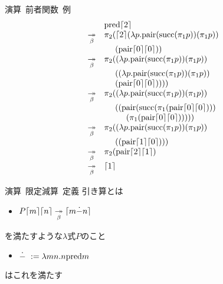 \documentclass[pdflatex,17pt]{beamer}
\begin{document}
\begin{frame}{演算~前者関数~例}
    \scriptsize
    $$ \begin{array}{rl}
             & {\rm pred}\lceil 2 \rceil \\
    \underset{\beta}{\twoheadrightarrow} & \pi_2 (\lceil 2 \rceil (\lambda p. {\rm pair} ({\rm succ} (\pi_1 p)) (\pi_1 p)) \\
             & ~~~~              ({\rm pair} \lceil 0 \rceil \lceil 0 \rceil)) \\
    \underset{\beta}{\twoheadrightarrow} & \pi_2 ((\lambda p. {\rm pair} ({\rm succ} (\pi_1 p)) (\pi_1 p)) \\
             & ~~~~   ((\lambda p. {\rm pair} ({\rm succ} (\pi_1 p)) (\pi_1 p)) \\
             & ~~~~              ({\rm pair} \lceil 0 \rceil \lceil 0 \rceil)))) \\
    \underset{\beta}{\twoheadrightarrow} & \pi_2 ((\lambda p. {\rm pair} ({\rm succ} (\pi_1 p)) (\pi_1 p)) \\
             & ~~~~   (({\rm pair} ({\rm succ} (\pi_1 ({\rm pair} \lceil 0 \rceil \lceil 0 \rceil))) \\
             & ~~~~ ~~~~ (\pi_1 ({\rm pair} \lceil 0 \rceil \lceil 0 \rceil))))) \\
    \underset{\beta}{\twoheadrightarrow} & \pi_2 ((\lambda p. {\rm pair} ({\rm succ} (\pi_1 p)) (\pi_1 p)) \\
             & ~~~~   (({\rm pair} \lceil 1 \rceil \lceil 0 \rceil))) \\
    \underset{\beta}{\twoheadrightarrow} & \pi_2 ({\rm pair} \lceil 2 \rceil \lceil 1 \rceil) \\
    \underset{\beta}{\twoheadrightarrow} & \lceil 1 \rceil \\
    \end{array} $$
\end{frame}

\begin{frame}{演算~限定減算~定義}
    引き算とは
    \begin{itemize}
        \item $P\lceil m \rceil\lceil n \rceil \underset{\beta}{\twoheadrightarrow} \lceil m\dot{-}n \rceil$
    \end{itemize}
    を満たすような$\lambda$式$P$のこと
    \pause
    \vspace{1em}
    \begin{itemize}
        \item $\dot{-}~:= \lambda m n. n {\rm pred} m$
    \end{itemize}
    はこれを満たす
\end{frame}
\end{document}
